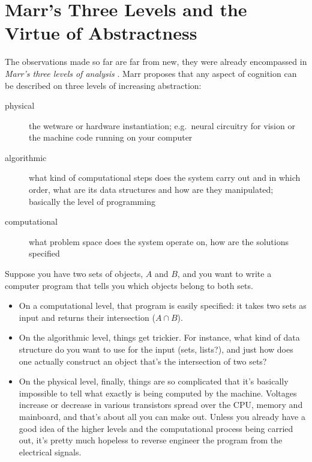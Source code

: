 \section{Marr's Three Levels and the Virtue of Abstractness}

The observations made so far are far from new, they were already encompassed in \emph{Marr's three levels of analysis} \citep{MarrPoggio76}.
Marr proposes that any aspect of cognition can be described on three levels of increasing abstraction:
%
\begin{description}
    \item[physical] the wetware or hardware instantiation; e.g.\ neural circuitry for vision or the machine code running on your computer
    \item[algorithmic] what kind of computational steps does the system carry out and in which order, what are its data structures and how are they manipulated; basically the level of programming
    \item[computational] what problem space does the system operate on, how are the solutions specified
\end{description}
%
\begin{examplebox}
    Suppose you have two sets of objects, $A$ and $B$, and you want to write a computer program that tells you which objects belong to both sets.
    \begin{itemize}
        \item On a computational level, that program is easily specified: it takes two sets as input and returns their intersection ($A \cap B$).
        \item On the algorithmic level, things get trickier.
        For instance, what kind of data structure do you want to use for the input (sets, lists?), and just how does one actually construct an object that's the intersection of two sets?
    \item On the physical level, finally, things are so complicated that it's basically impossible to tell what exactly is being computed by the machine.
        Voltages increase or decrease in various transistors spread over the CPU, memory and mainboard, and that's about all you can make out.
        Unless you already have a good idea of the higher levels and the computational process being carried out, it's pretty much hopeless to reverse engineer the program from the electrical signals.
    \end{itemize}
\end{examplebox}
